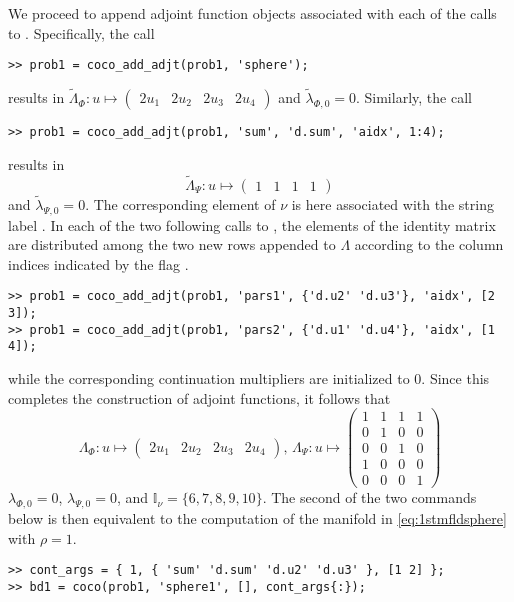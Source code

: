We proceed to append adjoint function objects associated with each of the calls to . Specifically, the call
\begin{lstlisting}[language=coco-highlight]
>> prob1 = coco_add_adjt(prob1, 'sphere');
\end{lstlisting}
results in $\tilde{\Lambda}_\Phi:u\mapsto\left(\begin{array}{cccc}2u_1 & 2u_2 & 2u_3 & 2u_4\end{array}\right)$ and $\tilde{\lambda}_{\Phi,0}=0$.
Similarly, the call
\begin{lstlisting}[language=coco-highlight]
>> prob1 = coco_add_adjt(prob1, 'sum', 'd.sum', 'aidx', 1:4);
\end{lstlisting}
results in 
\begin{equation}
\tilde{\Lambda}_\Psi:u\mapsto\left(\begin{array}{cccc}1 & 1 & 1 & 1\end{array}\right)
\end{equation}
and $\tilde{\lambda}_{\Psi,0}=0$. The corresponding element of $\nu$ is here associated with the string label . In each of the two following calls to , the elements of the identity matrix are distributed among the two new rows appended to $\Lambda$ according to the column indices indicated by the flag .
\begin{lstlisting}[language=coco-highlight]
>> prob1 = coco_add_adjt(prob1, 'pars1', {'d.u2' 'd.u3'}, 'aidx', [2 3]);
>> prob1 = coco_add_adjt(prob1, 'pars2', {'d.u1' 'd.u4'}, 'aidx', [1 4]);
\end{lstlisting}
while the corresponding continuation multipliers are initialized to $0$. Since this completes the construction of adjoint functions, it follows that
\begin{equation}
\Lambda_\Phi:u\mapsto\left(\begin{array}{cccc}2u_1 & 2u_2 & 2u_3 & 2u_4\end{array}\right),\,\Lambda_\Psi:u\mapsto\left(\begin{array}{cccc}1 & 1 & 1 & 1\\0 & 1 & 0 & 0\\0 & 0 & 1 & 0\\1 & 0 & 0 & 0\\0 & 0 & 0 & 1\end{array}\right)
\end{equation}
$\lambda_{\Phi,0}=0$, $\lambda_{\Psi,0}=0$, and $\mathbb{I}_\nu=\{6,7,8,9,10\}$. The second of the two commands below is then equivalent to the computation of the manifold in \eqref{eq:1stmfldsphere} with $\rho=1$.
\begin{lstlisting}[language=coco-highlight]
>> cont_args = { 1, { 'sum' 'd.sum' 'd.u2' 'd.u3' }, [1 2] };
>> bd1 = coco(prob1, 'sphere1', [], cont_args{:});
\end{lstlisting}

